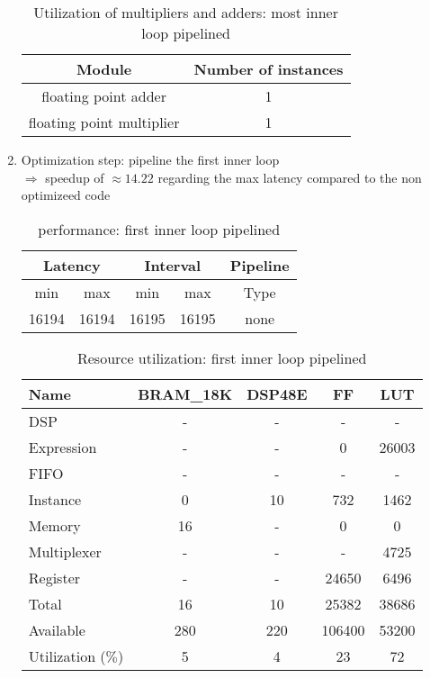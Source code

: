 \documentclass{article}
\begin{document}
\begin{enumerate}
	\begin{table}[H]
		\centering
		\begin{tabular}{cc}
			Module & Number of instances \\
			\hline
			floating point adder & 1 \\
			floating point multiplier & 1
		\end{tabular}
		\caption{Utilization of multipliers and adders: most inner loop pipelined}
		\label{1-a-resources-arithmetic-1}
	\end{table}


	\item Optimization step: pipeline the first inner loop \\
		$\Rightarrow$ speedup of $\approx 14.22 $ regarding the max latency compared to the non optimizeed code
	\begin{table}[H]
		\centering
		\begin{tabular}{ccccc}
			\multicolumn{2}{c}{Latency} & \multicolumn{2}{c}{Interval} & Pipeline\\
			\hline
			min  &   max  &   min  &   max  &   Type  \\
			16194&  16194&  16195&  16195&   none  
		\end{tabular}
		\caption{performance: first inner loop pipelined}
		\label{1-b-perf-table-2}
	\end{table}

	\begin{table}[H]
		\centering
		\begin{tabular}{lcccc}
			Name      & BRAM\_18K& DSP48E&   FF   &  LUT  \\
			\hline
			DSP              &        -&      -&       -&      -\\
			Expression       &        -&      -&       0&  26003\\
			FIFO             &        -&      -&       -&      -\\
			Instance         &        0&     10&     732&   1462\\
			Memory           &       16&      -&       0&      0\\
			Multiplexer      &        -&      -&       -&   4725\\
			Register         &        -&      -&   24650&   6496\\
			\hline
			Total            &       16&     10&   25382&  38686\\
			Available        &      280&    220&  106400&  53200\\
			\hline
			Utilization ($\%$)  &        5&      4&      23&     72
		\end{tabular}
		\caption{Resource utilization: first inner loop pipelined}
		\label{1-b-resources-2}
	\end{table}


\end{enumerate}
\end{document}
